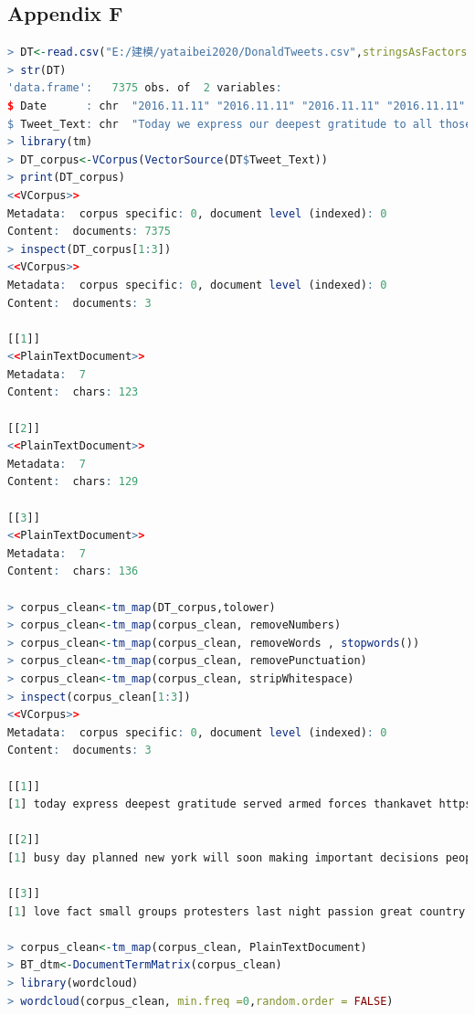 \documentclass{apmcmthesis}
\begin{document}
\subsection{Appendix F}
\begin{lstlisting}[language=r]
> DT<-read.csv("E:/建模/yataibei2020/DonaldTweets.csv",stringsAsFactors = FALSE)
> str(DT)
'data.frame':	7375 obs. of  2 variables:
$ Date      : chr  "2016.11.11" "2016.11.11" "2016.11.11" "2016.11.11" ...
$ Tweet_Text: chr  "Today we express our deepest gratitude to all those who have served in our armed forces. #ThankAVet https://t.co/wPk7QWpK8Z" "Busy day planned in New York. Will soon be making some very important decisions on the people who will be runni"| __truncated__ "Love the fact that the small groups of protesters last night have passion for our great country. We will all co"| __truncated__ "Just had a very open and successful presidential election. Now professional protesters, incited by the media, a"| __truncated__ ...
> library(tm)
> DT_corpus<-VCorpus(VectorSource(DT$Tweet_Text))
> print(DT_corpus)
<<VCorpus>>
Metadata:  corpus specific: 0, document level (indexed): 0
Content:  documents: 7375
> inspect(DT_corpus[1:3])
<<VCorpus>>
Metadata:  corpus specific: 0, document level (indexed): 0
Content:  documents: 3

[[1]]
<<PlainTextDocument>>
Metadata:  7
Content:  chars: 123

[[2]]
<<PlainTextDocument>>
Metadata:  7
Content:  chars: 129

[[3]]
<<PlainTextDocument>>
Metadata:  7
Content:  chars: 136

> corpus_clean<-tm_map(DT_corpus,tolower)
> corpus_clean<-tm_map(corpus_clean, removeNumbers)
> corpus_clean<-tm_map(corpus_clean, removeWords , stopwords())
> corpus_clean<-tm_map(corpus_clean, removePunctuation)
> corpus_clean<-tm_map(corpus_clean, stripWhitespace)
> inspect(corpus_clean[1:3])
<<VCorpus>>
Metadata:  corpus specific: 0, document level (indexed): 0
Content:  documents: 3

[[1]]
[1] today express deepest gratitude served armed forces thankavet httpstcowpkqwpkz

[[2]]
[1] busy day planned new york will soon making important decisions people will running government

[[3]]
[1] love fact small groups protesters last night passion great country will come together proud

> corpus_clean<-tm_map(corpus_clean, PlainTextDocument)
> BT_dtm<-DocumentTermMatrix(corpus_clean)
> library(wordcloud)
> wordcloud(corpus_clean, min.freq =0,random.order = FALSE)
\end{lstlisting}
\end{document}
